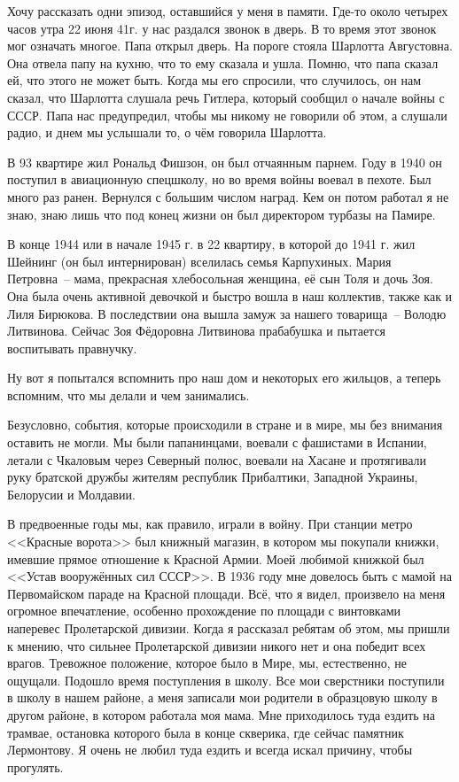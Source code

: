 Хочу рассказать одни эпизод, оставшийся у меня в памяти. Где-то около четырех часов утра 22 июня 41г. у нас раздался звонок в дверь. В то время этот звонок мог означать многое. Папа открыл дверь. На пороге стояла Шарлотта Августовна. Она отвела папу на кухню, что то ему сказала и ушла. Помню, что папа сказал ей, что этого не может быть. Когда мы его спросили, что случилось, он нам сказал, что Шарлотта слушала речь Гитлера, который сообщил о начале войны с СССР. Папа нас предупредил, чтобы мы никому не говорили об этом, а слушали радио, и днем мы услышали то, о чём говорила Шарлотта.

В 93 квартире жил Рональд Фишзон, он был отчаянным парнем. Году в 1940 он поступил в авиационную спецшколу, но во время войны воевал в пехоте. Был много раз ранен. Вернулся с большим числом наград. Кем он потом работал я не знаю, знаю лишь что под конец жизни он был директором турбазы на Памире.

В конце 1944 или в начале 1945 г. в 22 квартиру, в которой до 1941 г. жил Шейнинг (он был интернирован) вселилась семья Карпухиных. Мария Петровна~-- мама, прекрасная хлебосольная женщина, её сын Толя и дочь Зоя. Она была очень активной девочкой и быстро вошла в наш коллектив, также как и Лиля Бирюкова. В последствии она вышла замуж за нашего товарища~-- Володю Литвинова. Сейчас Зоя Фёдоровна Литвинова прабабушка и пытается воспитывать правнучку.

Ну вот я попытался вспомнить про наш дом и некоторых его жильцов, а теперь вспомним, что мы делали и чем занимались.

Безусловно, события, которые происходили в стране и в мире, мы без внимания оставить не могли. Мы были папанинцами, воевали с фашистами в Испании, летали с Чкаловым через Северный полюс, воевали на Хасане и протягивали руку братской дружбы жителям республик Прибалтики, Западной Украины, Белорусии и Молдавии.

В предвоенные годы мы, как правило, играли в войну. При станции метро <<Красные ворота>> был книжный магазин, в котором мы покупали книжки, имевшие прямое отношение к Красной Армии. Моей любимой книжкой был <<Устав вооружённых сил СССР>>. В 1936 году мне довелось быть с мамой на Первомайском параде на Красной площади. Всё, что я видел, произвело на меня огромное впечатление, особенно прохождение по площади с винтовками наперевес Пролетарской дивизии. Когда я рассказал ребятам об этом, мы пришли к мнению, что сильнее Пролетарской дивизии никого нет и она победит всех врагов. Тревожное положение, которое было в Мире, мы, естественно, не ощущали. Подошло время поступления в школу. Все мои сверстники поступили в школу в нашем районе, а меня записали мои родители в образцовую школу в другом районе, в котором работала моя мама. Мне приходилось туда ездить на трамвае, остановка которого была в конце скверика, где сейчас памятник Лермонтову. Я очень не любил туда ездить и всегда искал причину, чтобы прогулять.

